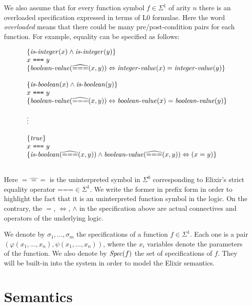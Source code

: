 We also assume that for every function symbol $f \in \Sigma^{1}$ of arity $n$
there is an overloaded specification expressed in terms of L0 formulae. Here the
word \emph{overloaded} means that there could be many pre/post-condition pairs
for each function. For example, equality can be specified as follows:

\[
\begin{array}{l}
\{ \mathit{is\mbox{-}integer}(x) \wedge \mathit{is\mbox{-}integer}(y) \}\\
x~\texttt{===}~y\\
\{ \mathit{boolean\mbox{-}value}(\widehat{===}(x, y)) \Leftrightarrow \mathit{integer\mbox{-}value}(x) = \mathit{integer\mbox{-}value}(y) \}\\
\\
\{ \mathit{is\mbox{-}boolean}(x) \wedge \mathit{is\mbox{-}boolean}(y) \}\\
x~\texttt{===}~y\\
\{ \mathit{boolean\mbox{-}value}(\widehat{===}(x, y)) \Leftrightarrow \mathit{boolean\mbox{-}value}(x) = \mathit{boolean\mbox{-}value}(y) \}\\
\\
\vdots
\\
\\
\{\mathit{true}\}\\
x~\texttt{===}~y\\
\{ \mathit{is\mbox{-}boolean}(\widehat{===}(x, y)) \wedge \mathit{boolean\mbox{-}value}(\widehat{===}(x, y)) \Leftrightarrow (x = y) \}\\
\\
\end{array}
\]

Here $\widehat{===}$ is the uninterpreted symbol in $\Sigma^{0}$ corresponding 
to Elixir's strict equality operator $\texttt{===} \in \Sigma^{1}$. We write the
former in prefix form in order to highlight the fact that it is an uninterpreted
function symbol in the logic. On the contrary, the $=$, $\Leftrightarrow$,
$\wedge$ in the specification above are actual connectives and operators of the
underlying logic.

We denote by $\sigma_1, \ldots, \sigma_m$ the specifications of a function $f
\in \Sigma^{1}$. Each one is a pair $(\varphi(x_1, \ldots, x_n), \psi(x_1,
\ldots, x_n))$, where the $x_i$ variables denote the parameters of the function.
We also denote by $\mathit{Spec}(f)$ the set of specifications of $f$. They will be
built-in into the system in order to model the Elixir semantics.

\section{Semantics}

